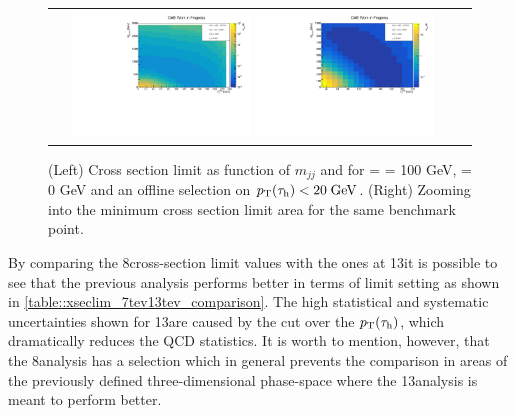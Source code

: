 \begin{figure}[tbh!]
	\centering
	\begin{tabular}{cc}
		\includegraphics[width=0.45\textwidth]{analysis/pics/JetInvMass_vs_MET_xsec_chi100_lsp000_taupt20.pdf}
		\includegraphics[width=0.45\textwidth]{analysis/pics/JetInvMass_vs_MET_xsec_chi100_lsp000_taupt20_zoom.pdf} 		
	\end{tabular}
	\caption{(Left) Cross section limit as function of $m_{jj}$ and \met for \charginopm = \neutralinotwo = 100 GeV, \neutralinoone = 0 GeV and an offline selection on $p_{\text{T}}(\tau_{\text{h}}) <  20\;\text{Ge}\kern-0.06667em\text{V}$. (Right) Zooming into the minimum cross section limit area for the same benchmark point.}
	\label{fig::xsec_lim_selected_results}
\end{figure}

By comparing the 8\tev cross-section limit values with the ones at 13\tev it is possible to see that the previous analysis performs better in terms of limit setting as shown in \autoref{table::xseclim_7tev13tev_comparison}. The high statistical and systematic uncertainties shown for 13\tev are caused by the cut over the $p_{\text{T}}(\tau_{\text{h}})$, which dramatically reduces the QCD statistics. It is worth to mention, however, that the 8\tev analysis has a selection which in general prevents the comparison in areas of the previously defined three-dimensional phase-space where the 13\tev analysis is meant to perform better.

